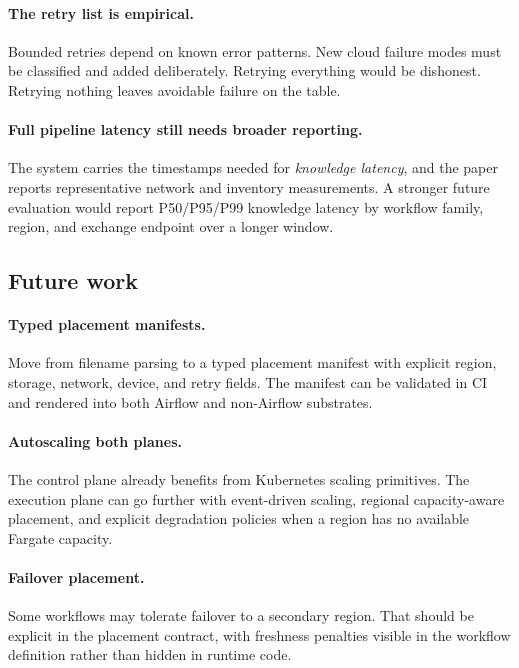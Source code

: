 \documentclass[11pt, reqno]{amsart}
\newcommand{\kmetric}{\emph{knowledge latency}}
\begin{document}
\paragraph{The retry list is empirical.}
Bounded retries depend on known error patterns. New cloud failure modes must be classified and added deliberately. Retrying everything would be dishonest. Retrying nothing leaves avoidable failure on the table.

\paragraph{Full pipeline latency still needs broader reporting.}
The system carries the timestamps needed for \kmetric{}, and the paper reports representative network and inventory measurements. A stronger future evaluation would report P50/P95/P99 knowledge latency by workflow family, region, and exchange endpoint over a longer window.

\subsection{Future work}

\paragraph{Typed placement manifests.}
Move from filename parsing to a typed placement manifest with explicit region, storage, network, device, and retry fields. The manifest can be validated in CI and rendered into both Airflow and non-Airflow substrates.

\paragraph{Autoscaling both planes.}
The control plane already benefits from Kubernetes scaling primitives. The execution plane can go further with event-driven scaling, regional capacity-aware placement, and explicit degradation policies when a region has no available Fargate capacity.

\paragraph{Failover placement.}
Some workflows may tolerate failover to a secondary region. That should be explicit in the placement contract, with freshness penalties visible in the workflow definition rather than hidden in runtime code.
\end{document}
